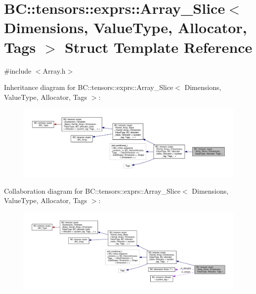 \hypertarget{classBC_1_1tensors_1_1exprs_1_1Array__Slice}{}\section{BC\+:\+:tensors\+:\+:exprs\+:\+:Array\+\_\+\+Slice$<$ Dimensions, Value\+Type, Allocator, Tags $>$ Struct Template Reference}
\label{classBC_1_1tensors_1_1exprs_1_1Array__Slice}


{\ttfamily \#include $<$Array.\+h$>$}



Inheritance diagram for BC\+:\+:tensors\+:\+:exprs\+:\+:Array\+\_\+\+Slice$<$ Dimensions, Value\+Type, Allocator, Tags $>$\+:
\nopagebreak
\begin{figure}[H]
\begin{center}
\leavevmode
\includegraphics[width=350pt]{classBC_1_1tensors_1_1exprs_1_1Array__Slice__inherit__graph}
\end{center}
\end{figure}


Collaboration diagram for BC\+:\+:tensors\+:\+:exprs\+:\+:Array\+\_\+\+Slice$<$ Dimensions, Value\+Type, Allocator, Tags $>$\+:
\nopagebreak
\begin{figure}[H]
\begin{center}
\leavevmode
\includegraphics[width=350pt]{classBC_1_1tensors_1_1exprs_1_1Array__Slice__coll__graph}
\end{center}
\end{figure}
